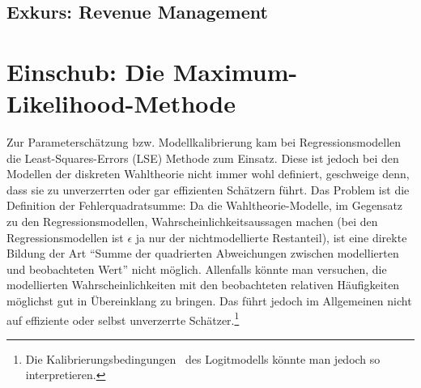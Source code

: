 \subsection{Exkurs: Revenue Management}


\section{\label{sec:maxlikelihood}Einschub: Die Maximum-Likelihood-Methode} 

Zur Parametersch\"atzung bzw. Modellkalibrierung kam bei 
Regressionsmodellen die Least-Squares-Errors (LSE)
Methode zum Einsatz. Diese ist jedoch bei den Modellen der diskreten
Wahltheorie nicht immer wohl definiert, geschweige denn, dass sie zu
unverzerrten oder gar effizienten Sch\"atzern f\"uhrt. Das Problem
ist die Definition der Fehlerquadratsumme: Da die Wahltheorie-Modelle,
im Gegensatz zu den Regressionsmodellen,
 Wahrscheinlichkeitsaussagen machen (bei den Regressionsmodellen ist
$\epsilon$ ja nur der nichtmodellierte Restanteil), ist eine direkte
Bildung der Art ``Summe der quadrierten Abweichungen zwischen
modellierten und beobachteten Wert'' nicht m\"oglich. Allenfalls
k\"onnte man versuchen, die modellierten Wahrscheinlichkeiten mit den
beobachteten relativen H\"aufigkeiten m\"oglichst gut in \"Ubereinklang
zu bringen. Das f\"uhrt jedoch im Allgemeinen nicht auf effiziente
oder selbst unverzerrte Sch\"atzer.\footnote{Die
  Kalibrierungsbedingungen~
 des Logitmodells k\"onnte man jedoch so interpretieren.} 

